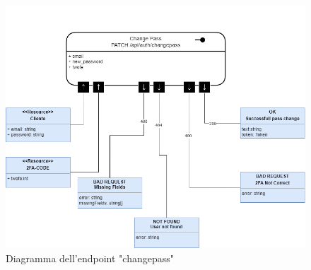\documentclass{report}
\begin{document}
\begin{figure}[H]
	\centering\includegraphics[width=1\textwidth]{images/microservizio-autenticazione/diagrams/diagramma_changepass.drawio.png}
	\caption{Diagramma dell'endpoint "changepass"}
\end{figure}
\end{document}
